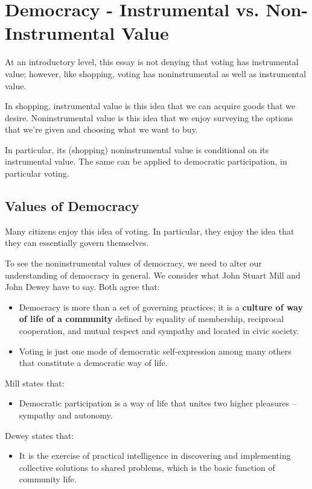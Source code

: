\documentclass[letterpaper]{article}
\begin{document}
\section{Democracy - Instrumental vs. Non-Instrumental Value}
At an introductory level, this essay is not denying that voting has instrumental value; however, like shopping, voting has noninstrumental as well as instrumental value. 

\bigskip 

In shopping, instrumental value is this idea that we can acquire goods that we desire. Noninstrumental value is this idea that we enjoy surveying the options that we're given and choosing what we want to buy. 

\bigskip 

In particular, its (shopping) noninstrumental value is conditional on its instrumental value. The same can be applied to democratic participation, in particular voting. 

\subsection{Values of Democracy}
Many citizens enjoy this idea of voting. In particular, they enjoy the idea that they can essentially govern themselves. 

\bigskip 

To see the noninstrumental values of democracy, we need to alter our understanding of democracy in general. We consider what John Stuart Mill and John Dewey have to say. Both agree that: 
\begin{itemize}
    \item Democracy is more than a set of governing practices; it is a \textbf{culture of way of life of a community} defined by equality of membership, reciprocal cooperation, and mutual respect and sympathy and located in civic society. 
    \item Voting is just one mode of democratic self-expression among many others that constitute a democratic way of life.
\end{itemize}
Mill states that: 
\begin{itemize}
    \item Democratic participation is a way of life that unites two higher pleasures -- sympathy and autonomy. 
\end{itemize}
Dewey states that:
\begin{itemize}
    \item It is the exercise of practical intelligence in discovering and implementing collective solutions to shared problems, which is the basic function of community life. 
\end{itemize}
\end{document}
